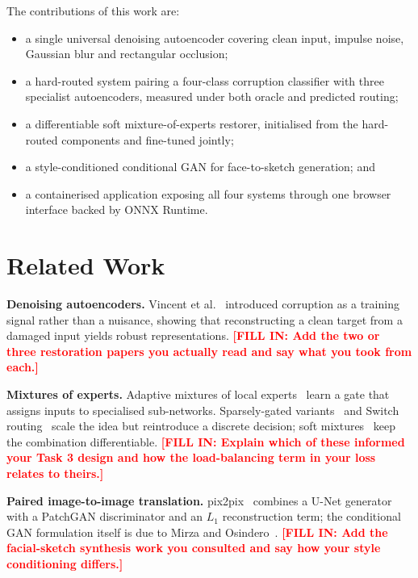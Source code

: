 \documentclass[conference]{IEEEtran}
\newcommand{\PLACEHOLDER}[1]{\textcolor{red}{\textbf{[FILL IN: #1]}}}
\begin{document}
The contributions of this work are:
\begin{itemize}
  \item a single universal denoising autoencoder covering clean input,
        impulse noise, Gaussian blur and rectangular occlusion;
  \item a hard-routed system pairing a four-class corruption classifier with
        three specialist autoencoders, measured under both oracle and predicted
        routing;
  \item a differentiable soft mixture-of-experts restorer, initialised from the
        hard-routed components and fine-tuned jointly;
  \item a style-conditioned conditional GAN for face-to-sketch generation; and
  \item a containerised application exposing all four systems through one
        browser interface backed by ONNX Runtime.
\end{itemize}

\section{Related Work}
\textbf{Denoising autoencoders.} Vincent et al.~\cite{vincent2008} introduced
corruption as a training signal rather than a nuisance, showing that
reconstructing a clean target from a damaged input yields robust
representations. \PLACEHOLDER{Add the two or three restoration papers you
actually read and say what you took from each.}

\textbf{Mixtures of experts.} Adaptive mixtures of local
experts~\cite{jacobs1991} learn a gate that assigns inputs to specialised
sub-networks. Sparsely-gated variants~\cite{shazeer2017} and Switch
routing~\cite{fedus2022} scale the idea but reintroduce a discrete decision;
soft mixtures~\cite{puigcerver2023} keep the combination differentiable.
\PLACEHOLDER{Explain which of these informed your Task 3 design and how the
load-balancing term in your loss relates to theirs.}

\textbf{Paired image-to-image translation.} pix2pix~\cite{isola2017} combines a
U-Net generator~\cite{ronneberger2015} with a PatchGAN discriminator and an
$L_1$ reconstruction term; the conditional GAN formulation itself is due to
Mirza and Osindero~\cite{mirza2014}. \PLACEHOLDER{Add the facial-sketch
synthesis work you consulted and say how your style conditioning differs.}
\end{document}
